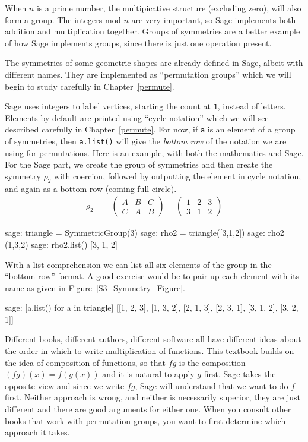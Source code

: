 %
When $n$ is a prime number, the multipicative structure (excluding zero), will also form a group.
%
The integers mod $n$ are very important, so Sage implements both addition and multiplication together.  Groups of symmetries are a better example of how Sage implements groups, since there is just one operation present.\par
%
%
The symmetries of some geometric shapes are already defined in Sage, albeit with different names.  They are implemented as ``permutation groups'' which we will begin to study carefully in Chapter~\ref{permute}.\par
%
Sage uses integers to label vertices, starting the count at \verb?1?, instead of letters.  Elements by default are printed using ``cycle notation'' which we will see described carefully in Chapter~\ref{permute}.  For now, if \verb?a? is an element of a group of symmetries, then \verb?a.list()? will give the \emph{bottom row} of the notation we are using for permutations.  Here is an example, with both the mathematics and Sage.  For the Sage part, we create the group of symmetries and then create the symmetry $\rho_2$ with coercion, followed by outputting the element in cycle notation, and again as a bottom row (coming full circle).
%
\begin{align*}
\rho_2&=
\begin{pmatrix}
A & B & C\\
C & A & B
\end{pmatrix}
=
\begin{pmatrix}
1 & 2 & 3\\
3 & 1 & 2
\end{pmatrix}
\end{align*}
%
\begin{sageexample}
sage: triangle = SymmetricGroup(3)
sage: rho2 = triangle([3,1,2])
sage: rho2
(1,3,2)
sage: rho2.list()
[3, 1, 2]
\end{sageexample}
%
With a list comprehension we can list all six elements of the group in the ``bottom row'' format.  A good exercise would be to pair up each element with its name as given in Figure~\ref{S3_Symmetry_Figure}.
%
\begin{sageexample}
sage: [a.list() for a in triangle]
[[1, 2, 3], [1, 3, 2], [2, 1, 3], [2, 3, 1], [3, 1, 2], [3, 2, 1]]
\end{sageexample}
%
Different books, different authors, different software all have different ideas about the order in which to write multiplication of functions.  This textbook builds on the idea of composition of functions, so that $fg$ is the composition $(fg)(x)=f(g(x))$ and it is natural to apply $g$ first.  Sage takes the opposite view and since we write $fg$, Sage will understand that we want to do $f$ first.  Neither approach is wrong, and neither is necessarily superior, they are just different and there are good arguments for either one.  When you consult other books that work with permutation groups, you want to first determine which approach it takes.\par
